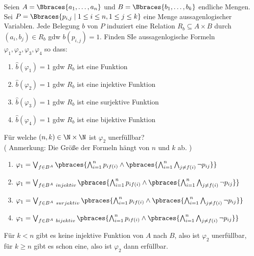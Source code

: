 
\begin{exercise}[48]

Seien $A = \Bbraces{a_1, \dots, a_n}$ und $B = \Bbraces{b_1, \dots, b_k}$ endliche Mengen.
Sei $P = \Bbraces{p_{i, j} \mid 1 \leq i \leq n, 1 \leq j \leq k}$ eine Menge aussagenlogischer Variablen.
Jede Belegung $b$ von $P$ induziert eine Relation $R_b \subseteq A \times B$ durch $(a_i, b_j) \in R_b$ gdw $b(p_{i, j}) = 1$.
Finden SIe aussagenlogische Formeln $\varphi_1, \varphi_2, \varphi_3, \varphi_4$ so dass:

\begin{enumerate}[label = \arabic*.]
    \item $\hat{b}(\varphi_1) = 1$ gdw $R_b$ ist eine Funktion
    \item $\hat{b}(\varphi_2) = 1$ gdw $R_b$ ist eine injektive Funktion
    \item $\hat{b}(\varphi_3) = 1$ gdw $R_b$ ist eine surjektive Funktion
    \item $\hat{b}(\varphi_4) = 1$ gdw $R_b$ ist eine bijektive Funktion
\end{enumerate}

Für welche $(n, k) \in \N \times \N$ ist $\varphi_2$ unerfüllbar? \\

(
    Anmerkung:
    Die Größe der Formeln hängt von $n$ und $k$ ab.
)

\end{exercise}


\begin{solution}
\phantom{}
\begin{enumerate}[label = \arabic*.]
	\item $\varphi_1 = \bigvee_{f \in B^A}\pbraces{\bigwedge_{i=1}^n p_{if(i)} \land \pbraces{\bigwedge_{i=1}^n \bigwedge_{j \neq f(i)} \neg p_{ij}}}$ 
	\item $\varphi_1 = \bigvee_{f \in B^A ~ injektiv}\pbraces{\bigwedge_{i=1}^n p_{if(i)} \land \pbraces{\bigwedge_{i=1}^n \bigwedge_{j \neq f(i)} \neg p_{ij}}}$
	\item $\varphi_1 = \bigvee_{f \in B^A ~ surjektiv}\pbraces{\bigwedge_{i=1}^n p_{if(i)} \land \pbraces{\bigwedge_{i=1}^n \bigwedge_{j \neq f(i)} \neg p_{ij}}}$
	\item $\varphi_1 = \bigvee_{f \in B^A ~ bijektiv}\pbraces{\bigwedge_{i=1}^n p_{if(i)} \land \pbraces{\bigwedge_{i=1}^n \bigwedge_{j \neq f(i)} \neg p_{ij}}}$
\end{enumerate}
Für $k < n$ gibt es keine injektive Funktion von $A$ nach $B$, also ist $\varphi_2$ unerfüllbar, für $k \geq n$ gibt es schon eine, also ist $\varphi_2$ dann erfüllbar.

\end{solution}


